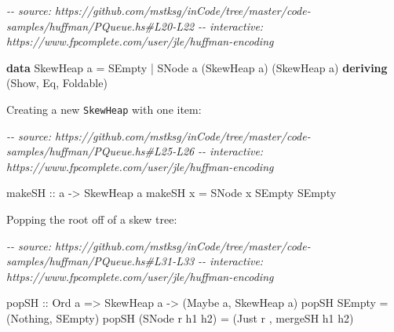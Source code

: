 \documentclass[]{article}
\newenvironment{Shaded}{}{}
\newcommand{\CommentTok}[1]{\textcolor[rgb]{0.38,0.63,0.69}{\textit{#1}}}
\newcommand{\DataTypeTok}[1]{\textcolor[rgb]{0.56,0.13,0.00}{#1}}
\newcommand{\KeywordTok}[1]{\textcolor[rgb]{0.00,0.44,0.13}{\textbf{#1}}}
\newcommand{\NormalTok}[1]{#1}
\newcommand{\OperatorTok}[1]{\textcolor[rgb]{0.40,0.40,0.40}{#1}}
\newcommand{\OtherTok}[1]{\textcolor[rgb]{0.00,0.44,0.13}{#1}}
\begin{document}
\begin{Shaded}
\begin{Highlighting}[]
\CommentTok{{-}{-} source: https://github.com/mstksg/inCode/tree/master/code{-}samples/huffman/PQueue.hs\#L20{-}L22}
\CommentTok{{-}{-} interactive: https://www.fpcomplete.com/user/jle/huffman{-}encoding}

\KeywordTok{data} \DataTypeTok{SkewHeap}\NormalTok{ a }\OtherTok{=} \DataTypeTok{SEmpty}
                \OperatorTok{|} \DataTypeTok{SNode}\NormalTok{ a (}\DataTypeTok{SkewHeap}\NormalTok{ a) (}\DataTypeTok{SkewHeap}\NormalTok{ a)}
                \KeywordTok{deriving}\NormalTok{ (}\DataTypeTok{Show}\NormalTok{, }\DataTypeTok{Eq}\NormalTok{, }\DataTypeTok{Foldable}\NormalTok{)}
\end{Highlighting}
\end{Shaded}

Creating a new \texttt{SkewHeap} with one item:

\begin{Shaded}
\begin{Highlighting}[]
\CommentTok{{-}{-} source: https://github.com/mstksg/inCode/tree/master/code{-}samples/huffman/PQueue.hs\#L25{-}L26}
\CommentTok{{-}{-} interactive: https://www.fpcomplete.com/user/jle/huffman{-}encoding}

\OtherTok{makeSH ::}\NormalTok{ a }\OtherTok{{-}>} \DataTypeTok{SkewHeap}\NormalTok{ a}
\NormalTok{makeSH x }\OtherTok{=} \DataTypeTok{SNode}\NormalTok{ x }\DataTypeTok{SEmpty} \DataTypeTok{SEmpty}
\end{Highlighting}
\end{Shaded}

Popping the root off of a skew tree:

\begin{Shaded}
\begin{Highlighting}[]
\CommentTok{{-}{-} source: https://github.com/mstksg/inCode/tree/master/code{-}samples/huffman/PQueue.hs\#L31{-}L33}
\CommentTok{{-}{-} interactive: https://www.fpcomplete.com/user/jle/huffman{-}encoding}

\OtherTok{popSH ::} \DataTypeTok{Ord}\NormalTok{ a }\OtherTok{=>} \DataTypeTok{SkewHeap}\NormalTok{ a }\OtherTok{{-}>}\NormalTok{ (}\DataTypeTok{Maybe}\NormalTok{ a, }\DataTypeTok{SkewHeap}\NormalTok{ a)}
\NormalTok{popSH }\DataTypeTok{SEmpty}          \OtherTok{=}\NormalTok{ (}\DataTypeTok{Nothing}\NormalTok{, }\DataTypeTok{SEmpty}\NormalTok{)}
\NormalTok{popSH (}\DataTypeTok{SNode}\NormalTok{ r h1 h2) }\OtherTok{=}\NormalTok{ (}\DataTypeTok{Just}\NormalTok{ r , mergeSH h1 h2)}
\end{Highlighting}
\end{Shaded}
\end{document}
